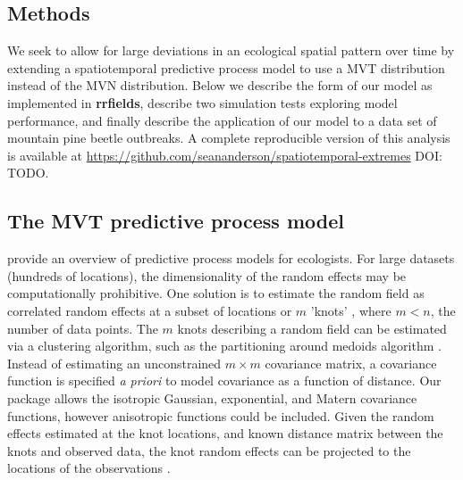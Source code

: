 \documentclass[12pt,english]{article}
\begin{document}
\begin{spacing}{1.9}
\section{Methods}

We seek to allow for large deviations in an ecological spatial pattern over
time by extending a spatiotemporal predictive process model to use a MVT
distribution instead of the MVN distribution. Below we describe the form of
our model as implemented in \textbf{rrfields}, describe two simulation tests
exploring model performance, and finally describe the application of our model
to a data set of mountain pine beetle outbreaks.
A complete reproducible version of this analysis is available at
\url{https://github.com/seananderson/spatiotemporal-extremes} DOI: TODO.

\subsection{The MVT predictive process model}

\citet{latimer2009} provide an overview of predictive process models for
ecologists. For large datasets (hundreds of locations), the dimensionality of the random
effects may be computationally prohibitive. One solution is to estimate the random
field as correlated random effects at a subset of locations or $m$ 'knots'
\citep[e.g.][]{latimer2009, shelton2014}, where $m < n$, the number of data points. The
$m$ knots describing a random field can be estimated via a clustering algorithm,
such as the partitioning around medoids
algorithm \citep[the \texttt{pam} function in the R package
\textbf{cluster};][]{reynolds2006}.
Instead of estimating an unconstrained $m \times m$ covariance matrix, a covariance
function is specified \emph{a priori} to model covariance as a function of distance.
Our package allows the isotropic Gaussian, exponential, and Matern covariance functions,
however anisotropic functions could be included. Given the random
effects estimated at the knot locations, and known distance matrix between the knots
and observed data, the knot random effects can be projected to the locations of the
observations \citep[][Figure~\ref{fig:didactic}]{latimer2009, finley2009}.


\end{spacing}
\end{document}
